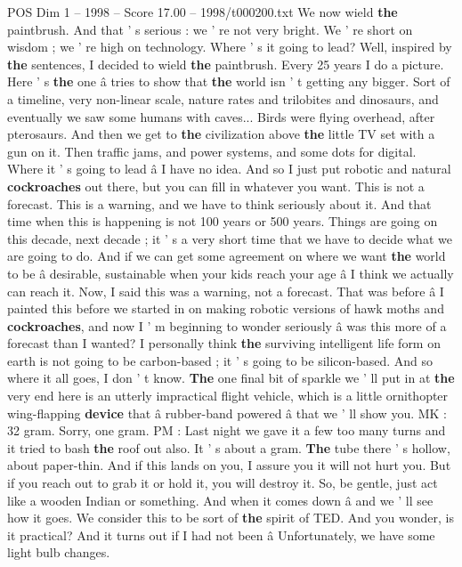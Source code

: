 \begin{textsample}{POS Dim 1 – 1998 – Score 17.00 – 1998/t000200.txt}
We now wield \textbf{the} paintbrush.
And that ' s serious : we ' re not very bright.
We ' re short on wisdom ; we ' re high on technology.
Where ' s it going to lead?
Well, inspired by \textbf{the} sentences, I decided to wield \textbf{the} paintbrush.
Every 25 years I do a picture.
Here ' s \textbf{the} one â tries to show that \textbf{the} world isn ' t getting any bigger.
Sort of a timeline, very non-linear scale, nature rates and trilobites and dinosaurs, and eventually we saw some humans with caves...
Birds were flying overhead, after pterosaurs.
And then we get to \textbf{the} civilization above \textbf{the} little TV set with a gun on it.
Then traffic jams, and power systems, and some dots for digital.
Where it ' s going to lead â I have no idea.
And so I just put robotic and natural \textbf{cockroaches} out there, but you can fill in whatever you want.
This is not a forecast.
This is a warning, and we have to think seriously about it.
And that time when this is happening is not 100 years or 500 years.
Things are going on this decade, next decade ; it ' s a very short time that we have to decide what we are going to do.
And if we can get some agreement on where we want \textbf{the} world to be â desirable, sustainable when your kids reach your age â I think we actually can reach it.
Now, I said this was a warning, not a forecast.
That was before â I painted this before we started in on making robotic versions of hawk moths and \textbf{cockroaches}, and now I ' m beginning to wonder seriously â was this more of a forecast than I wanted?
I personally think \textbf{the} surviving intelligent life form on earth is not going to be carbon-based ; it ' s going to be silicon-based.
And so where it all goes, I don ' t know. \textbf{The} one final bit of sparkle we ' ll put in at \textbf{the} very end here is an utterly impractical flight vehicle, which is a little ornithopter wing-flapping \textbf{device} that â rubber-band powered â that we ' ll show you.
MK : 32 gram.
Sorry, one gram.
PM : Last night we gave it a few too many turns and it tried to bash \textbf{the} roof out also.
It ' s about a gram. \textbf{The} tube there ' s hollow, about paper-thin.
And if this lands on you, I assure you it will not hurt you.
But if you reach out to grab it or hold it, you will destroy it.
So, be gentle, just act like a wooden Indian or something.
And when it comes down â and we ' ll see how it goes.
We consider this to be sort of \textbf{the} spirit of TED.
And you wonder, is it practical?
And it turns out if I had not been â Unfortunately, we have some light bulb changes.

\end{textsample}
